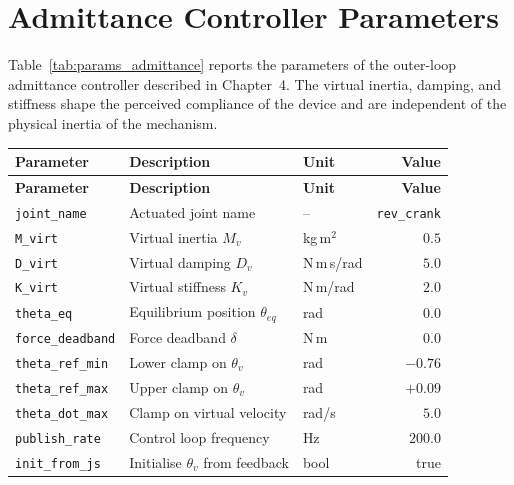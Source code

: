 \section{Admittance Controller Parameters}
\label{app:params:admittance}

Table~\ref{tab:params_admittance} reports the parameters of the outer-loop admittance controller described in Chapter~4. The virtual inertia, damping, and stiffness shape the perceived compliance of the device and are independent of the physical inertia of the mechanism.

\small
\begin{tabularx}{\textwidth}{@{}l L l r@{}}
\caption{Admittance controller parameters
(\texttt{admittance\_controller} node).}
\label{tab:params_admittance}\\
\hline
\textbf{Parameter} & \textbf{Description} & \textbf{Unit} & \textbf{Value} \\
\hline
\endfirsthead
\hline
\textbf{Parameter} & \textbf{Description} & \textbf{Unit} & \textbf{Value} \\
\hline
\endhead
\texttt{joint\_name}     & Actuated joint name                  & --           & \texttt{rev\_crank} \\
\texttt{M\_virt}         & Virtual inertia $M_v$                & kg\,m$^2$    & $0.5$   \\
\texttt{D\_virt}         & Virtual damping $D_v$                & N\,m\,s/rad  & $5.0$   \\
\texttt{K\_virt}         & Virtual stiffness $K_v$              & N\,m/rad     & $2.0$   \\
\texttt{theta\_eq}       & Equilibrium position $\theta_{eq}$   & rad          & $0.0$   \\
\texttt{force\_deadband} & Force deadband $\delta$              & N\,m         & $0.0$   \\
\texttt{theta\_ref\_min} & Lower clamp on $\theta_v$            & rad          & $-0.76$  \\
\texttt{theta\_ref\_max} & Upper clamp on $\theta_v$            & rad          & $+0.09$  \\
\texttt{theta\_dot\_max} & Clamp on virtual velocity            & rad/s        & $5.0$   \\
\texttt{publish\_rate}   & Control loop frequency               & Hz           & $200.0$ \\
\texttt{init\_from\_js}  & Initialise $\theta_v$ from feedback  & bool         & true    \\
\hline
\end{tabularx}
\normalsize


